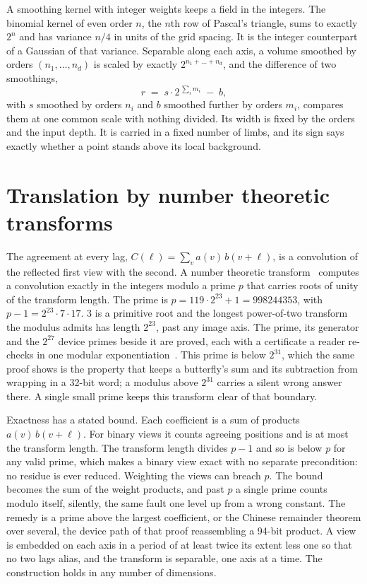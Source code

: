 A smoothing kernel with integer weights keeps a field in the integers. The binomial kernel of even
order \(n\), the \(n\)th row of Pascal's triangle, sums to exactly \(2^n\) and has variance \(n/4\) in units of
the grid spacing. It is the integer counterpart of a Gaussian of that variance. Separable along each
axis, a volume smoothed by orders \((n_1, \dots, n_d)\) is scaled by exactly \(2^{n_1 + \dots + n_d}\), and
the difference of two smoothings,
\[
r \;=\; s \cdot 2^{\,\sum_i m_i} \;-\; b,
\]
with \(s\) smoothed by orders \(n_i\) and \(b\) smoothed further by orders \(m_i\), compares them at one common
scale with nothing divided. Its width is fixed by the orders and the input depth. It is carried in a
fixed number of limbs, and its sign says exactly whether a point stands above its local background.

\section{Translation by number theoretic transforms}

The agreement at every lag, \(C(\ell) = \sum_v a(v)\, b(v + \ell)\), is a convolution of the reflected
first view with the second. A number theoretic transform~\cite{src:DTIC-ADA013395,src:S1076567008702167} computes a convolution exactly in the
integers modulo a prime \(p\) that carries roots of unity of the transform length. The prime is
\(p = 119 \cdot 2^{23} + 1 = 998244353\), with \(p - 1 = 2^{23} \cdot 7 \cdot 17\). 3 is a primitive
root and the longest power-of-two transform the modulus admits has length \(2^{23}\), past any image
axis. The prime, its generator and the \(2^{27}\) device primes beside it are proved, each with a
certificate a reader re-checks in one modular exponentiation~\cite{src:Quigg-twiddle-constants}. This prime is below \(2^{31}\),
which the same proof shows is the property that keeps a butterfly's sum and its subtraction from
wrapping in a 32-bit word; a modulus above \(2^{31}\) carries a silent wrong answer there. A single
small prime keeps this transform clear of that boundary.

Exactness has a stated bound. Each coefficient is a sum of products \(a(v)\, b(v + \ell)\). For binary
views it counts agreeing positions and is at most the transform length. The transform length divides
\(p - 1\) and so is below \(p\) for any valid prime, which makes a binary view exact with no separate
precondition: no residue is ever reduced. Weighting the views can breach \(p\). The bound becomes
the sum of the weight products, and past \(p\) a single prime counts modulo itself, silently, the same
fault one level up from a wrong constant. The remedy is a prime above the largest coefficient, or the
Chinese remainder theorem over several, the device path of that proof reassembling a 94-bit product. A
view is embedded on each axis in a period of at least twice its extent less one so that no two lags
alias, and the transform is separable, one axis at a time. The construction holds in any number of
dimensions.

